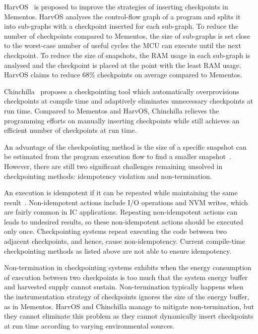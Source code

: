 HarvOS~\cite{bhatti2017harvos} is proposed to improve the strategies of inserting checkpoints in Mementos. HarvOS analyses the control-flow graph of a program and splits it into sub-graphs with a checkpoint inserted for each sub-graph. To reduce the number of checkpoints compared to Mementos, the size of sub-graphs is set close to the worst-case number of useful cycles the MCU can execute until the next checkpoint. To reduce the size of snapshots, the RAM usage in each sub-graph is analysed and the checkpoint is placed at the point with the least RAM usage. HarvOS claims to reduce 68\% checkpoints on average compared to Mementos.

Chinchilla~\cite{maeng2018adaptive} proposes a checkpointing tool which automatically overprovisions checkpoints at compile time and adaptively eliminates unnecessary checkpoints at run time. Compared to Mementos and HarvOS, Chinchilla relieves the programming efforts on manually inserting checkpoints while still achieves an efficient number of checkpoints at run time.

An advantage of the checkpointing method is the size of a specific snapshot can be estimated from the program execution flow to find a smaller snapshot~\cite{bhatti2017harvos}. However, there are still two significant challenges remaining unsolved in checkpointing methods: idempotency violation and non-termination. 

An execution is idempotent if it can be repeated while maintaining the same result~\cite{lucia2015simpler}. Non-idempotent actions include I/O operations and NVM writes, which are fairly common in IC applications. Repeating non-idempotent actions can leads to undesired results, so these non-idempotent actions should be executed only once. Checkpointing systems repeat executing the code between two adjacent checkpoints, and hence, cause non-idempotency. Current compile-time checkpointing methods as listed above are not able to ensure idempotency. 

Non-termination in checkpointing systems exhibits when the energy consumption of execution between two checkpoints is too much that the system energy buffer and harvested supply cannot sustain. Non-termination typically happens when the instrumentation strategy of checkpoints ignores the size of the energy buffer, as in Mementos. HarvOS and Chinchilla manage to mitigate non-termination, but they cannot eliminate this problem as they cannot dynamically insert checkpoints at run time according to varying environmental sources. 

